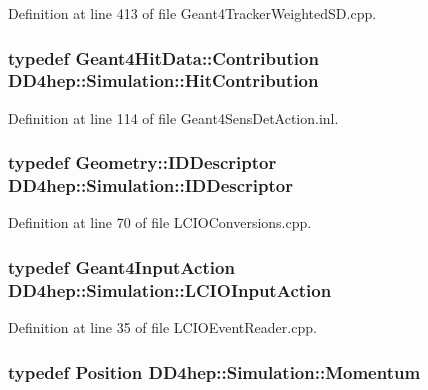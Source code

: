 Definition at line 413 of file Geant4TrackerWeightedSD.cpp.\hypertarget{namespace_d_d4hep_1_1_simulation_af3e4b03fc6b6e8a0ed0cba9dbf6c1f69}{
\subsubsection[{HitContribution}]{\setlength{\rightskip}{0pt plus 5cm}typedef {\bf Geant4HitData::Contribution} {\bf DD4hep::Simulation::HitContribution}}}
\label{namespace_d_d4hep_1_1_simulation_af3e4b03fc6b6e8a0ed0cba9dbf6c1f69}


Definition at line 114 of file Geant4SensDetAction.inl.\hypertarget{namespace_d_d4hep_1_1_simulation_a5f50c11f1a261ca45bb2e86ea6621083}{
\subsubsection[{IDDescriptor}]{\setlength{\rightskip}{0pt plus 5cm}typedef {\bf Geometry::IDDescriptor} {\bf DD4hep::Simulation::IDDescriptor}}}
\label{namespace_d_d4hep_1_1_simulation_a5f50c11f1a261ca45bb2e86ea6621083}


Definition at line 70 of file LCIOConversions.cpp.\hypertarget{namespace_d_d4hep_1_1_simulation_a1e6fc5fffc58682e1f7cfb8baa1f0987}{
\subsubsection[{LCIOInputAction}]{\setlength{\rightskip}{0pt plus 5cm}typedef {\bf Geant4InputAction} {\bf DD4hep::Simulation::LCIOInputAction}}}
\label{namespace_d_d4hep_1_1_simulation_a1e6fc5fffc58682e1f7cfb8baa1f0987}


Definition at line 35 of file LCIOEventReader.cpp.\hypertarget{namespace_d_d4hep_1_1_simulation_aead01eb580dc503a5abba194d179c963}{
\subsubsection[{Momentum}]{\setlength{\rightskip}{0pt plus 5cm}typedef {\bf Position} {\bf DD4hep::Simulation::Momentum}}}
\label{namespace_d_d4hep_1_1_simulation_aead01eb580dc503a5abba194d179c963}



